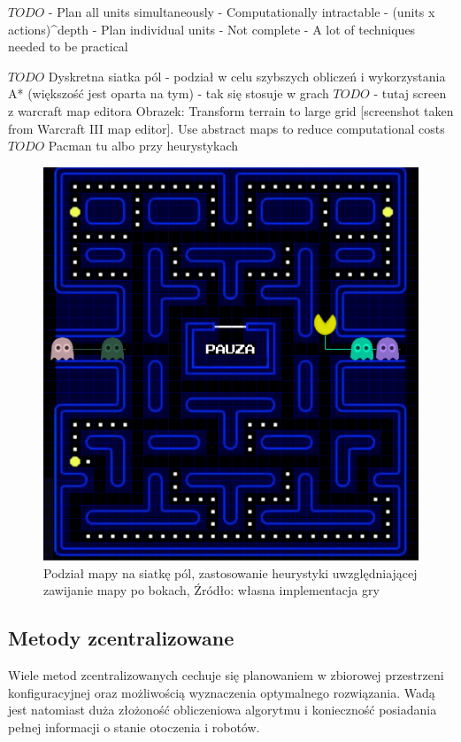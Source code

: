 $TODO$
- Plan all units simultaneously
	- Computationally intractable
	- (units x actions)^depth
- Plan individual units
	- Not complete
	- A lot of techniques needed to be practical

$TODO$
Dyskretna siatka pól - podział w celu szybszych obliczeń i wykorzystania A* (większość jest oparta na tym) - tak się stosuje w grach
$TODO$ - tutaj screen z warcraft map editora
Obrazek: Transform terrain to large grid [screenshot taken from Warcraft III map editor]. \cite{hierpathfindinginrts}
Use abstract maps to reduce computational costs
$TODO$ Pacman tu albo przy heurystykach
\begin{figure}[H]
	\centering
	\includegraphics[width=13cm]{img/paclan1}
	\caption{Podział mapy na siatkę pól, zastosowanie heurystyki uwzględniającej zawijanie mapy po bokach, Źródło: własna implementacja gry}
	\label{fig:image_paclan1}
\end{figure}

\subsection{Metody zcentralizowane}
Wiele metod zcentralizowanych cechuje się planowaniem w zbiorowej przestrzeni konfiguracyjnej oraz możliwością wyznaczenia optymalnego rozwiązania.
Wadą jest natomiast duża złożoność obliczeniowa algorytmu i konieczność posiadania pełnej informacji o stanie otoczenia i robotów.

